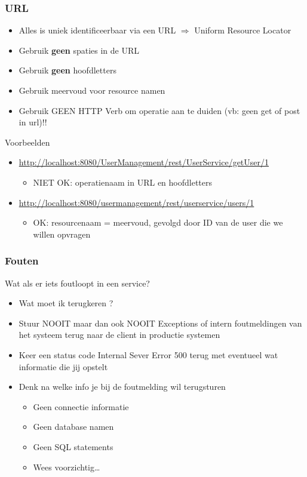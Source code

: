 \documentclass{article}
\newcommand{\bold}[1]{\textbf{#1}}
\begin{document}
\subsubsection{URL}
\begin{itemize}
    \item Alles is uniek identificeerbaar via een URL $\Rightarrow$ Uniform Resource Locator
    \item Gebruik \bold{geen} spaties in de URL
    \item Gebruik \bold{geen} hoofdletters
    \item Gebruik meervoud voor resource namen
    \item Gebruik GEEN HTTP Verb om operatie aan te duiden (vb: geen get of post in url)!!
\end{itemize}

Voorbeelden 

\begin{itemize}
    \item \url{http://localhost:8080/UserManagement/rest/UserService/getUser/1} 
    \begin{itemize}
        \item NIET OK: operatienaam in URL en hoofdletters
    \end{itemize}
    \item \url{http://localhost:8080/usermanagement/rest/userservice/users/1} 
    \begin{itemize}
        \item OK: resourcenaam = meervoud, gevolgd door ID van de user die we willen opvragen
    \end{itemize}
\end{itemize}

\subsubsection{Fouten}
Wat als er iets foutloopt in een service?

\begin{itemize}
    \item Wat moet ik terugkeren ?
    \item Stuur NOOIT maar dan ook NOOIT Exceptions of intern foutmeldingen van het systeem terug naar de client in productie systemen
    \item Keer een status code Internal Sever Error 500 terug met eventueel wat informatie die jij opstelt
    \item Denk na welke info je bij de foutmelding wil terugsturen
    \begin{itemize}
        \item Geen connectie informatie
        \item Geen database namen
        \item Geen SQL statements
        \item Wees voorzichtig\dots
    \end{itemize}
\end{itemize}
\end{document}
